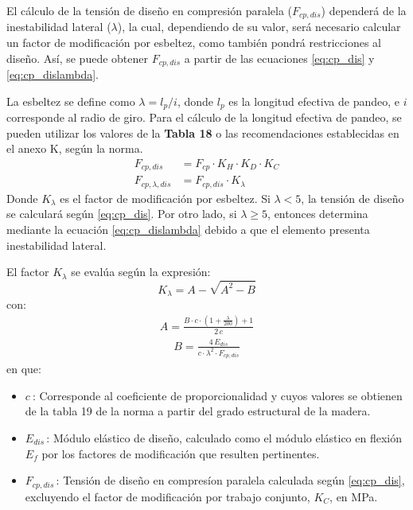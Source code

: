 El cálculo de la tensión de diseño en compresión paralela ($F_{cp,dis}$) dependerá de la inestabilidad lateral ($\lambda$), la cual, dependiendo de su valor, será necesario calcular un factor de modificación por esbeltez, como también pondrá restricciones al diseño. Así, se puede obtener $F_{cp,dis}$ a partir de las ecuaciones \ref{eq:cp_dis} y \ref{eq:cp_dislambda}. 

La esbeltez se define como $\lambda = l_p/i$, donde $l_p$ es la longitud efectiva de pandeo, e $i$ corresponde al radio de giro. Para el cálculo de la longitud efectiva de pandeo, se pueden utilizar los valores de la \textbf{Tabla 18} o las recomendaciones establecidas en el anexo K, según la norma.
\begin{subequations}
\begin{align}
	F_{cp,dis} &= F_{cp} \cdot K_H \cdot K_D \cdot K_C \label{eq:cp_dis}\\
	F_{cp,\lambda,dis} &= F_{cp,dis} \cdot K_{\lambda} \label{eq:cp_dislambda}
\end{align}
\end{subequations}
Donde $K_{\lambda}$ es el factor de modificación por esbeltez. Si $\lambda < 5$, la tensión de diseño se calculará según \ref{eq:cp_dis}. Por otro lado, si $\lambda \geq 5$, entonces determina mediante la ecuación \ref{eq:cp_dislambda} debido a que el elemento presenta inestabilidad lateral.

El factor $K_{\lambda}$ se evalúa según la expresión:
\begin{equation}\label{eq:k_lambda}
	K_{\lambda} = A - \sqrt{A^2 - B}
\end{equation}
con:
\begin{gather}
	A = \frac{B\cdot c\cdot (1 + \frac{\lambda}{200}) + 1}{2\,c}
\end{gather}
\vspace{-8mm}
\begin{gather}
	B = \frac{4\, E_{dis}}{c\cdot \lambda^2\cdot F_{cp,dis}}
\end{gather}
en que:
\begin{itemize}
	\item $c\:$: Corresponde al coeficiente de proporcionalidad y cuyos valores se obtienen de la tabla 19 de la norma a partir del grado estructural de la madera.
	\item $E_{dis}\,$: Módulo elástico de diseño, calculado como el módulo elástico en flexión $E_f$ por los factores de modificación que resulten pertinentes.  
	\item $F_{cp,dis}\,$: Tensión de diseño en compresíon paralela calculada según \ref{eq:cp_dis}, excluyendo el factor de modificación por trabajo conjunto, $K_C$, en MPa.
\end{itemize}

